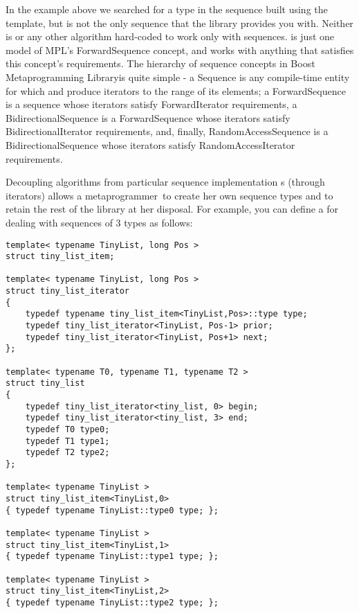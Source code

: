 \documentclass{kapproc}
\newcommand{\Mpl}{Boost Meta\-pro\-gram\-ming Library}
\newcommand{\mpgmer}{meta\-pro\-gram\-mer}
\begin{document}
In the  example above we searched for a type in the
sequence built using the  template, but
 is not the only sequence that the library provides you
with. Neither is or any other algorithm
hard-coded to work only with  sequences.  is
just one model of MPL's ForwardSequence concept, and  works
with anything that satisfies this concept's requirements. The
hierarchy of sequence concepts in \Mpl is quite simple - a Sequence is
any compile-time entity for which  and 
produce iterators to the range of its elements; a ForwardSequence is a
sequence whose iterators satisfy ForwardIterator requirements, a
BidirectionalSequence is a ForwardSequence whose iterators satisfy
BidirectionalIterator requirements, and, finally, RandomAccessSequence
is a BidirectionalSequence whose iterators satisfy
RandomAccessIterator requirements.

Decoupling algorithms from particular sequence implementation s
(through iterators) allows a \mpgmer\ to create her own sequence types
and to retain the rest of the library at her disposal. For example,
you can define a  for dealing with sequences of 3
types as follows:

{\small
\begin{codesamp}\begin{verbatim}
template< typename TinyList, long Pos >
struct tiny_list_item;

template< typename TinyList, long Pos >
struct tiny_list_iterator
{
    typedef typename tiny_list_item<TinyList,Pos>::type type;
    typedef tiny_list_iterator<TinyList, Pos-1> prior;
    typedef tiny_list_iterator<TinyList, Pos+1> next;
};

template< typename T0, typename T1, typename T2 >
struct tiny_list
{
    typedef tiny_list_iterator<tiny_list, 0> begin;
    typedef tiny_list_iterator<tiny_list, 3> end;
    typedef T0 type0;
    typedef T1 type1;
    typedef T2 type2;
};

template< typename TinyList >
struct tiny_list_item<TinyList,0>
{ typedef typename TinyList::type0 type; };

template< typename TinyList >
struct tiny_list_item<TinyList,1>
{ typedef typename TinyList::type1 type; };

template< typename TinyList >
struct tiny_list_item<TinyList,2>
{ typedef typename TinyList::type2 type; };
\end{verbatim}
\end{codesamp}
}
\end{document}
